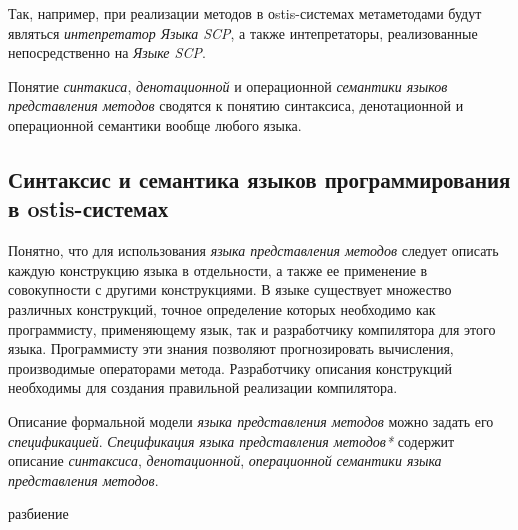Так, например, при реализации методов в оstis-системах метаметодами будут являться \textit{интепретатор Языка SCP}, а также интепретаторы, реализованные непосредственно на \textit{Языке SCP}.

Понятие \textit{синтакиса}, \textit{денотационной} и операционной \textit{семантики языков представления методов} сводятся к понятию синтаксиса, денотационной и операционной семантики вообще любого языка.

\subsection{Синтаксис и семантика языков программирования в ostis-системах}
\label{sec_programs_method_representation_language_syntax_and_semantic}

Понятно, что для использования \textit{языка представления методов} следует описать каждую конструкцию языка в отдельности, а также ее применение в совокупности с другими конструкциями. В языке существует множество различных конструкций, точное определение которых необходимо как программисту, применяющему язык, так и разработчику компилятора для этого языка. Программисту эти знания позволяют прогнозировать вычисления, производимые операторами метода. Разработчику описания конструкций необходимы для создания правильной реализации компилятора.

Описание формальной модели \textit{языка представления методов} можно задать его \textit{спецификацией}. \textit{Спецификация языка представления методов*} содержит описание \textit{синтаксиса}, \textit{денотационной}, \textit{операционной} \textit{семантики языка представления методов}.

\begin{SCn}
\begin{scnrelfromset}{разбиение}
    \begin{scnindent}
    \end{scnindent}
    \begin{scnindent}
    \end{scnindent}
    \begin{scnindent}
    \end{scnindent}
\end{scnrelfromset}
\end{SCn}

